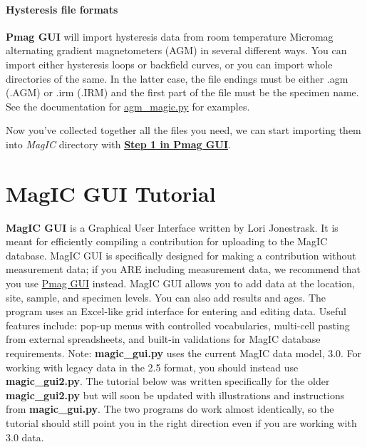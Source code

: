 \documentclass[11pt]{book}
\begin{document}
{{

\subsubsection{Hysteresis file formats}
{\bf Pmag GUI} will import hysteresis data from room temperature  Micromag alternating gradient magnetometers (AGM)  in several different ways.  You can import either hysteresis loops or backfield curves, or you can import whole directories of the same.  In the latter case, the file endings must be either .agm (.AGM) or .irm (.IRM) and the first part of the file must be the specimen name.
 See the documentation for  \href{#agm\_magic.py}{agm\_magic.py} for examples.


Now you've collected together all the files you need, we can start importing them into {\it MagIC} directory with   \href{#convert2magic}{\bf Step 1 in Pmag GUI}.




\chapter{MagIC GUI Tutorial}
\label{chap:MagIC GUI}

{\bf MagIC GUI} is a Graphical User Interface written by Lori Jonestrask.  It is meant for efficiently compiling a contribution for uploading to the MagIC database.  MagIC GUI is specifically designed for making a contribution without measurement data; if you ARE including measurement data, we recommend that you use \href{#pmag_gui.py}{Pmag GUI} instead.
MagIC GUI allows you to add data at the location, site, sample, and specimen levels.  You can also add results and ages.  The program uses an Excel-like grid interface for entering and editing data.  Useful features include: pop-up menus with controlled vocabularies, multi-cell pasting from external spreadsheets, and built-in validations for MagIC database requirements.
Note: {\bf magic\_gui.py} uses the current MagIC data model, 3.0.  For working with legacy data in the 2.5 format, you should instead use {\bf magic\_gui2.py}.  The tutorial below was written specifically for the older  {\bf magic\_gui2.py} but will soon be updated with illustrations and instructions from {\bf magic\_gui.py}. The two programs do work almost identically, so the tutorial should still point you in the right direction even if you are working with 3.0 data.


}}
\end{document}
